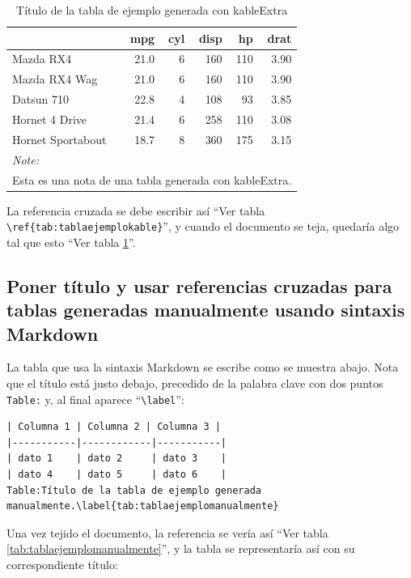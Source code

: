 \documentclass[spanish]{article}
\begin{document}
\begin{table}[H]
\centering
\caption{\label{tab:tablaejemplokable}Título de la tabla de ejemplo generada con kableExtra}
\centering
\begin{tabular}[t]{lrrrrr}
\toprule
  & mpg & cyl & disp & hp & drat\\
\midrule
Mazda RX4 & 21.0 & 6 & 160 & 110 & 3.90\\
Mazda RX4 Wag & 21.0 & 6 & 160 & 110 & 3.90\\
Datsun 710 & 22.8 & 4 & 108 & 93 & 3.85\\
Hornet 4 Drive & 21.4 & 6 & 258 & 110 & 3.08\\
Hornet Sportabout & 18.7 & 8 & 360 & 175 & 3.15\\
\bottomrule
\multicolumn{6}{l}{\rule{0pt}{1em}\textit{Note: }}\\
\multicolumn{6}{l}{\rule{0pt}{1em}Esta es una nota de una tabla generada con kableExtra.}\\
\end{tabular}
\end{table}

La referencia cruzada se debe escribir así ``Ver tabla
\texttt{\textbackslash{}ref\{tab:tablaejemplokable\}}'', y cuando el
documento se teja, quedaría algo tal que esto ``Ver tabla
\ref{tab:tablaejemplokable}''.

\subsection{Poner título y usar referencias cruzadas para tablas
generadas manualmente usando sintaxis
Markdown}\label{poner-tuxedtulo-y-usar-referencias-cruzadas-para-tablas-generadas-manualmente-usando-sintaxis-markdown}

La tabla que usa la sintaxis Markdown se escribe como se muestra abajo.
Nota que el título está justo debajo, precedido de la palabra clave con
dos puntos \texttt{Table:} y, al final aparece
``\texttt{\textbackslash{}label}'':

\begin{Verbatim}[samepage=true]
| Columna 1 | Columna 2 | Columna 3 |
|-----------|------------|-----------|
| dato 1    | dato 2     | dato 3    |
| dato 4    | dato 5     | dato 6    |
Table:Título de la tabla de ejemplo generada manualmente.\label{tab:tablaejemplomanualmente}
\end{Verbatim}

Una vez tejido el documento, la referencia se vería así ``Ver tabla
\ref{tab:tablaejemplomanualmente}'', y la tabla se representaría así con
su correspondiente título:
\end{document}
